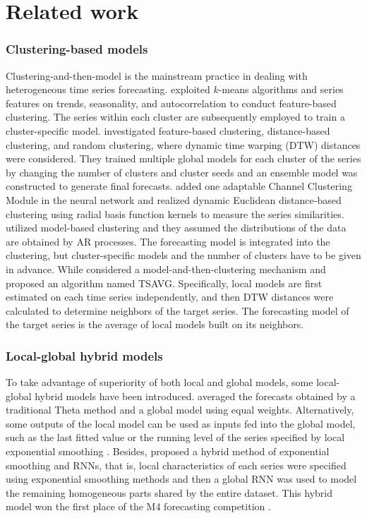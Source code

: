 \section{Related work}
\subsubsection{Clustering-based models}
    Clustering-and-then-model is the mainstream practice in dealing with heterogeneous time series forecasting. \citet{Bandara2020, Semenoglou2021} exploited $k$-means algorithms and series features on trends, seasonality, and autocorrelation to conduct feature-based clustering. The series within each cluster are subsequently employed to train a cluster-specific model. \citet{Godahewa2021} investigated feature-based clustering, distance-based clustering, and random clustering, where dynamic time warping (DTW) distances were considered. They trained multiple global models for each cluster of the series by changing the number of clusters and cluster seeds and an ensemble model was constructed to generate final forecasts. \citet{Chen2024} added one adaptable Channel Clustering Module in the neural network and realized dynamic Euclidean distance-based clustering using radial basis function kernels to measure the series similarities. \citet{Froehwirth-Schnatter2008} utilized model-based clustering and they assumed the distributions of the data are obtained by AR processes. The forecasting model is integrated into the clustering, but cluster-specific models and the number of clusters have to be given in advance. While \citet{Neubauer2024} considered a model-and-then-clustering mechanism and proposed an algorithm named TSAVG. Specifically, local models are first estimated on each time series independently, and then DTW distances were calculated to determine neighbors of the target series. The forecasting model of the target series is the average of local models built on its neighbors.
    
    \subsubsection{Local-global hybrid models}
    To take advantage of superiority of both local and global models, some local-global hybrid models have been introduced. \citet{Semenoglou2021} averaged the forecasts obtained by a traditional Theta method and a global model using equal weights. Alternatively, some outputs of the local model can be used as inputs fed into the global model, such as the last fitted value or the running level of the series specified by local exponential smoothing \citep{Semenoglou2021}. Besides, \citet{Smyl2020} proposed a hybrid method of exponential smoothing and RNNs, that is, local characteristics of each series were specified using exponential smoothing methods and then a global RNN was used to model the remaining homogeneous parts shared by the entire dataset. This hybrid model won the first place of the M4 forecasting competition \citep{Makridakis2020}.
    

